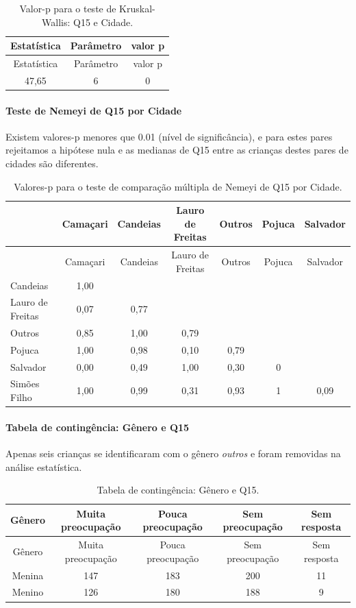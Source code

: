 \documentclass[]{article}
\let\oldparagraph\paragraph
\renewcommand{\paragraph}[1]{\oldparagraph{#1}\mbox{}}
\begin{document}
\begin{longtable}[]{@{}ccc@{}}
\caption{\label{tab:unnamed-chunk-79}Valor-p para o teste de Kruskal-Wallis: Q15 e Cidade.}\tabularnewline
\toprule
Estatística & Parâmetro & valor p\tabularnewline
\midrule
\endfirsthead
\toprule
Estatística & Parâmetro & valor p\tabularnewline
\midrule
\endhead
47,65 & 6 & 0\tabularnewline
\bottomrule
\end{longtable}

\hypertarget{teste-de-nemeyi-de-q15-por-cidade}{%
\paragraph{Teste de Nemeyi de Q15 por Cidade}\label{teste-de-nemeyi-de-q15-por-cidade}}

Existem valores-p menores que 0.01 (nível de significância), e para estes pares rejeitamos a hipótese nula e as medianas de Q15 entre as crianças destes pares de cidades são diferentes.

\begin{longtable}[]{@{}lcccccc@{}}
\caption{\label{tab:unnamed-chunk-81}Valores-p para o teste de comparação múltipla de Nemeyi de Q15 por Cidade.}\tabularnewline
\toprule
& Camaçari & Candeias & Lauro de Freitas & Outros & Pojuca & Salvador\tabularnewline
\midrule
\endfirsthead
\toprule
& Camaçari & Candeias & Lauro de Freitas & Outros & Pojuca & Salvador\tabularnewline
\midrule
\endhead
Candeias & 1,00 & & & & &\tabularnewline
Lauro de Freitas & 0,07 & 0,77 & & & &\tabularnewline
Outros & 0,85 & 1,00 & 0,79 & & &\tabularnewline
Pojuca & 1,00 & 0,98 & 0,10 & 0,79 & &\tabularnewline
Salvador & 0,00 & 0,49 & 1,00 & 0,30 & 0 &\tabularnewline
Simões Filho & 1,00 & 0,99 & 0,31 & 0,93 & 1 & 0,09\tabularnewline
\bottomrule
\end{longtable}

\cleardoublepage

\hypertarget{tabela-de-continguxeancia-guxeanero-e-q15}{%
\paragraph{Tabela de contingência: Gênero e Q15}\label{tabela-de-continguxeancia-guxeanero-e-q15}}

Apenas seis crianças se identificaram com o gênero \emph{outros} e foram removidas na análise estatística.

\begin{longtable}[]{@{}ccccc@{}}
\caption{\label{tab:unnamed-chunk-82}Tabela de contingência: Gênero e Q15.}\tabularnewline
\toprule
Gênero & Muita preocupação & Pouca preocupação & Sem preocupação & Sem resposta\tabularnewline
\midrule
\endfirsthead
\toprule
Gênero & Muita preocupação & Pouca preocupação & Sem preocupação & Sem resposta\tabularnewline
\midrule
\endhead
Menina & 147 & 183 & 200 & 11\tabularnewline
Menino & 126 & 180 & 188 & 9\tabularnewline
\bottomrule
\end{longtable}
\end{document}
